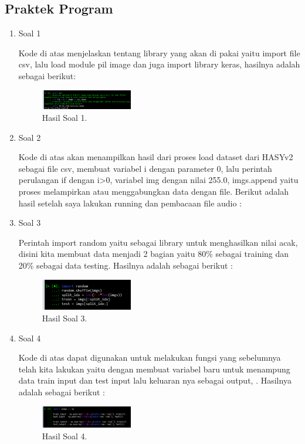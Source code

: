 \subsection{Praktek Program}
\begin{enumerate}
	\item Soal 1
	\hfill\break
	
	Kode di atas menjelaskan tentang library yang akan di pakai yaitu import file csv, lalu load module pil image dan juga import library keras, hasilnya adalah sebagai berikut:
	\begin{figure}[H]
	\centering
		\includegraphics[width=4cm]{figures/1174070/7/materi/hasil1.PNG}
		\caption{Hasil Soal 1.}
	\end{figure}

	\item Soal 2
	\hfill\break
	
	Kode di atas akan menampilkan hasil dari proses load dataset dari HASYv2 sebagai file csv, membuat variabel i dengan parameter 0, lalu perintah perulangan if dengan i>0, variabel img dengan nilai 255.0, imgs.append yaitu  proses melampirkan atau menggabungkan data dengan file. Berikut adalah hasil setelah saya lakukan running dan pembacaan file audio :

	\item Soal 3
	\hfill\break
	
	Perintah import random yaitu sebagai library untuk menghasilkan nilai acak, disini kita membuat data menjadi 2 bagian yaitu 80\% sebagai training dan 20\% sebagai data testing. Hasilnya adalah sebagai berikut :
	\begin{figure}[H]
	\centering
		\includegraphics[width=4cm]{figures/1174070/7/materi/hasil3.PNG}
		\caption{Hasil Soal 3.}
	\end{figure}

	\item Soal 4
	\hfill\break
	
	Kode di atas dapat digunakan untuk melakukan fungsi yang sebelumnya telah kita lakukan yaitu dengan membuat variabel baru untuk menampung data train input dan test input lalu keluaran nya sebagai output, . Hasilnya adalah sebagai berikut :
	\begin{figure}[H]
	\centering
		\includegraphics[width=4cm]{figures/1174070/7/materi/hasil4.PNG}
		\caption{Hasil Soal 4.}
	\end{figure}


\end{enumerate}
